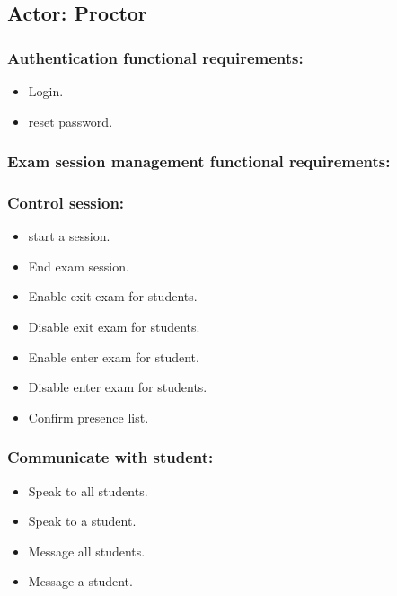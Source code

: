 \documentclass[a4paper,12p]{article}
\begin{document}
     \subsection{Actor: Proctor}
     \begin{itemize}
     \subsubsection{Authentication functional requirements:}
     \begin{itemize}
         \item Login.
         \item reset password.
     \end{itemize}

     \subsubsection{Exam session management functional requirements:}
     \begin{itemize}
        \subsubsection{Control session:}
         \begin{itemize}
             \item start a session.
             \item End exam session.
             \item Enable exit exam for students.
             \item Disable exit exam for students.
             \item Enable enter exam for student.
             \item Disable enter exam for students.
             \item Confirm presence list.
         \end{itemize}
         \subsubsection{Communicate with student:}
         \begin{itemize}
             \item Speak to all students.
             \item Speak to a student.
             \item Message all students.
             \item Message a student.
            \end{itemize}

\end{itemize}
\end{itemize}
\end{document}
